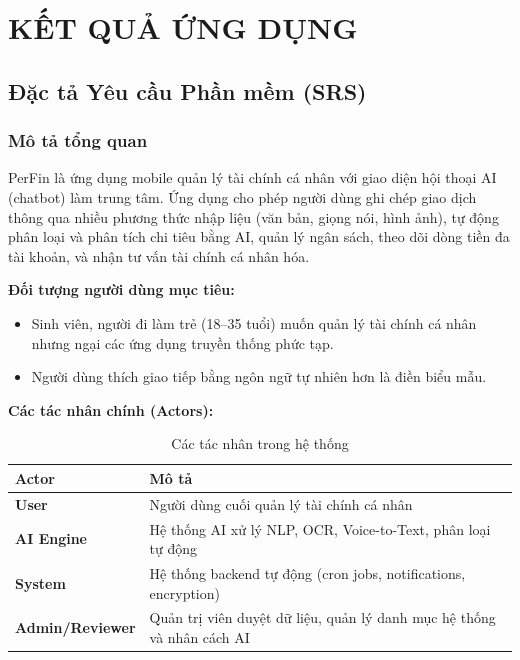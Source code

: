 \chapter{KẾT QUẢ ỨNG DỤNG}
\label{ch:results}

\section{Đặc tả Yêu cầu Phần mềm (SRS)}
\label{sec:srs}

\subsection{Mô tả tổng quan}
\label{subsec:overall_description}

PerFin là ứng dụng mobile quản lý tài chính cá nhân với giao diện hội thoại AI (chatbot) làm trung tâm. Ứng dụng cho phép người dùng ghi chép giao dịch thông qua nhiều phương thức nhập liệu (văn bản, giọng nói, hình ảnh), tự động phân loại và phân tích chi tiêu bằng AI, quản lý ngân sách, theo dõi dòng tiền đa tài khoản, và nhận tư vấn tài chính cá nhân hóa.

\textbf{Đối tượng người dùng mục tiêu:}
\begin{itemize}
    \item Sinh viên, người đi làm trẻ (18--35 tuổi) muốn quản lý tài chính cá nhân nhưng ngại các ứng dụng truyền thống phức tạp.
    \item Người dùng thích giao tiếp bằng ngôn ngữ tự nhiên hơn là điền biểu mẫu.
\end{itemize}

\textbf{Các tác nhân chính (Actors):}

\begin{table}[htbp]
\centering
\begin{tabularx}{\textwidth}{|l|X|}
\hline
\textbf{Actor} & \textbf{Mô tả} \\ \hline
\textbf{User} & Người dùng cuối quản lý tài chính cá nhân \\ \hline
\textbf{AI Engine} & Hệ thống AI xử lý NLP, OCR, Voice-to-Text, phân loại tự động \\ \hline
\textbf{System} & Hệ thống backend tự động (cron jobs, notifications, encryption) \\ \hline
\textbf{Admin/Reviewer} & Quản trị viên duyệt dữ liệu, quản lý danh mục hệ thống và nhân cách AI \\ \hline
\end{tabularx}
\caption{Các tác nhân trong hệ thống}
\label{tab:actors}
\end{table}

